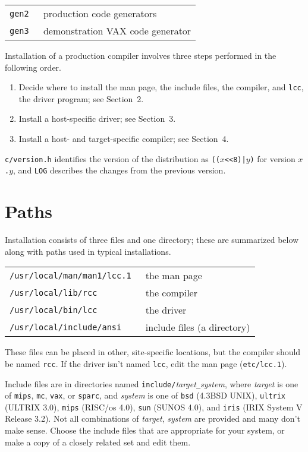 \begin{center}
\begin{tabular}{ll}
\tt gen2	& production code generators \\
\tt gen3	& demonstration VAX code generator \\
\end{tabular}
\end{center}

Installation of a production compiler
involves three steps performed in the following order.
\begin{enumerate}
\item Decide where to install the man page, the include files,
the compiler, and \verb|lcc|, the driver program; see Section~2.

\item Install a host-specific driver; see Section~3.

\item Install a host- and target-specific compiler; see Section~4.
\end{enumerate}

\verb|c/version.h| identifies the version of the distribution
as {\tt (($x$<<8)|$y$)} for version {\tt $x$.$y$},
and \verb|LOG| describes the changes from the previous version.


\section{Paths}

Installation consists of three files and one directory;
these are summarized below along with paths used in typical installations.

\begin{center}
\begin{tabular}{ll}
\tt /usr/local/man/man1/lcc.1	& the man page \\
\tt /usr/local/lib/rcc		& the compiler \\
\tt /usr/local/bin/lcc		& the driver \\
\tt /usr/local/include/ansi	& include files (a directory) \\
\end{tabular}
\end{center}

These files can be placed in other, site-specific locations,
but the compiler should be named \verb|rcc|.
If the driver isn't named \verb|lcc|, edit the man page (\verb|etc/lcc.1|).

Include files are in directories named \verb|include/|{\it target}\verb|_|{\it system},
where {\it target\/} is one of \verb|mips|, \verb|mc|, \verb|vax|, or \verb|sparc|,
and {\it system\/} is one of
\verb|bsd| (4.3BSD UNIX),
\verb|ultrix| (ULTRIX 3.0),
\verb|mips| (RISC/os 4.0),
\verb|sun| (SUNOS 4.0), and
\verb|iris| (IRIX System V Release 3.2).
Not all combinations of {\it target}, {\it system\/} are provided
and many don't make sense.
Choose the include files that are appropriate for your system,
or make a copy of a closely related set and edit them.

